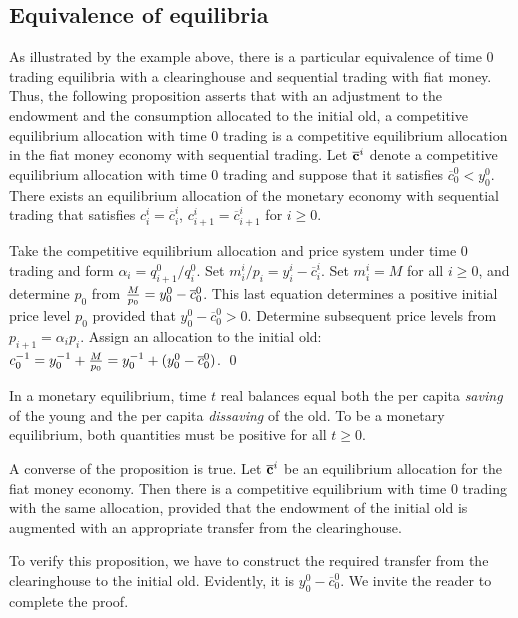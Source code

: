 \subsection{Equivalence of equilibria}
As illustrated by the example above, there is a particular equivalence 
of time 0 trading equilibria with a clearinghouse and sequential
trading with fiat money.  
Thus, the following proposition
asserts that  with an adjustment to the endowment and the consumption allocated
to the initial old, a competitive equilibrium
allocation with time $0$ trading
is a competitive equilibrium  allocation in the fiat money economy with
sequential trading.
\medskip
{}  Let $\overline {\bf c}^i$ denote a competitive equilibrium
 allocation with time $0$ trading
  and suppose that it satisfies
$\overline c^0_0 < y^0_0$.
There exists
an equilibrium allocation  of the monetary economy with sequential trading 
 that satisfies $c^i_i = \overline c^i_i$, $c^i_{i+1} = \overline
c^i_{i+1}$ for $i \geq 0$.

\medskip
{}  Take the competitive equilibrium allocation
and  price system under time 0 trading 
and form $ \alpha_i = q^0_{i+1}/q^0_i$.  Set
$m_i^i/p_i = y_i^i - \overline c_i^i$. Set $m_i^i = M$ for all $i \geq 0$,
and   determine $p_0$ from ${M \over p_0} = y_0^0  - \overline c_0^0$.
This last equation determines a positive initial price level
$p_0$ provided that $y_0^0 - \overline c_0^0 >0$.  Determine
subsequent price levels from $p_{i+1} = \alpha_i p_i$.
Assign an allocation to the  initial old: %
$c^{-1}_0 = y^{-1}_0 + {M \over p_0} = y^{-1}_0 +(y_0^0 - \overline c_0^0)$.  \qed

\medskip
In a monetary equilibrium, time $t$ real balances
equal both the per capita {\it saving\/} of the young and the
per capita {\it dissaving\/} of the old. To be a monetary equilibrium, both quantities must
be positive for all $t \geq 0$.


A converse of the proposition is true.
\medskip
{}  Let    $\overline {\bf c}^i$ be an
equilibrium allocation for the fiat money economy.    Then
there is a competitive equilibrium with time $0$ trading
with the same allocation, provided that the endowment
of the initial old is augmented with an appropriate  transfer
from the clearinghouse.
\medskip

To  verify this proposition, we have to construct
the required transfer from the clearinghouse to the initial
old.  Evidently, it is $y^0_0 - \overline c^0_0$.  We invite
the reader to complete  the proof.



